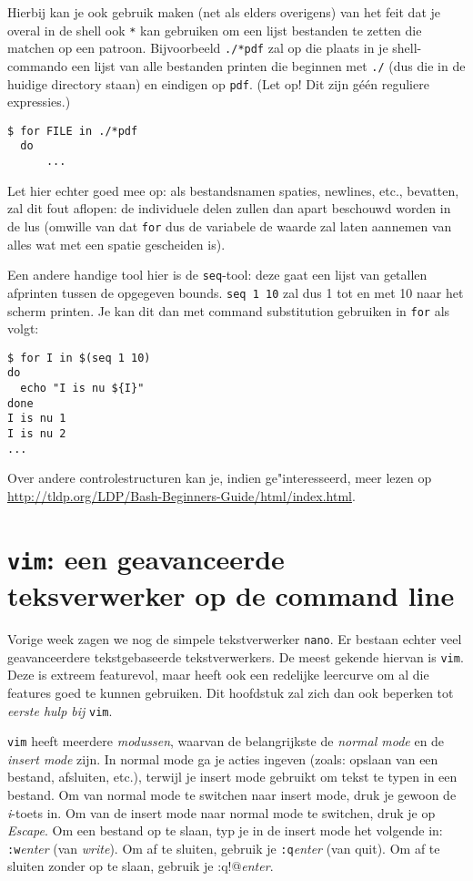 \documentclass[a4paper,twoside,openany]{memoir}
\begin{document}
Hierbij kan je ook gebruik maken (net als elders overigens) van het feit dat je
overal in de shell ook \verb!*! kan gebruiken om een lijst bestanden te zetten
die matchen op een patroon. Bijvoorbeeld \verb!./*pdf! zal op die plaats in je
shell-commando een lijst van alle bestanden printen die beginnen met \verb!./!
(dus die in de huidige directory staan) en eindigen op \verb!pdf!. (Let op! Dit
zijn g\'e\'en reguliere expressies.)
\begin{verbatim}
$ for FILE in ./*pdf
  do
      ...
\end{verbatim}

Let hier echter goed mee op: als bestandsnamen spaties, newlines, etc.,
bevatten, zal dit fout aflopen: de individuele delen zullen dan apart beschouwd
worden in de lus (omwille van dat \verb!for! dus de variabele de waarde zal
laten aannemen van alles wat met een spatie gescheiden is).

Een andere handige tool hier is de \verb!seq!-tool: deze gaat een lijst van
getallen afprinten tussen de opgegeven bounds. \verb!seq 1 10! zal dus 1 tot en
met 10 naar het scherm printen. Je kan dit dan met command substitution
gebruiken in \verb!for! als volgt:

\begin{verbatim}
$ for I in $(seq 1 10)
do
  echo "I is nu ${I}"
done
I is nu 1
I is nu 2
...
\end{verbatim}

Over andere controlestructuren kan je, indien ge"interesseerd, meer lezen op
\url{http://tldp.org/LDP/Bash-Beginners-Guide/html/index.html}.

\chapter{\texttt{vim}: een geavanceerde teksverwerker op de command line}

Vorige week zagen we nog de simpele tekstverwerker \verb!nano!. Er bestaan
echter veel geavanceerdere tekstgebaseerde tekstverwerkers. De meest gekende
hiervan is \verb!vim!. Deze is extreem featurevol, maar heeft ook een redelijke
leercurve om al die features goed te kunnen gebruiken. Dit hoofdstuk zal zich
dan ook beperken tot \emph{eerste hulp bij} \verb!vim!.

\verb!vim! heeft meerdere \emph{modussen}, waarvan de belangrijkste de
\emph{normal mode} en de \emph{insert mode} zijn. In normal mode ga je acties
ingeven (zoals: opslaan van een bestand, afsluiten, etc.), terwijl je insert
mode gebruikt om tekst te typen in een bestand. Om van normal mode te switchen
naar insert mode, druk je gewoon de \emph{i}-toets in. Om van de insert mode
naar normal mode te switchen, druk je op \emph{Escape}. Om een bestand op te
slaan, typ je in de insert mode het volgende in: \verb!:w!\emph{enter} (van
\emph{write}). Om af te sluiten, gebruik je \verb!:q!\emph{enter} (van quit).
Om af te sluiten zonder op te slaan, gebruik je \verb@:q!@\emph{enter}.
\end{document}
